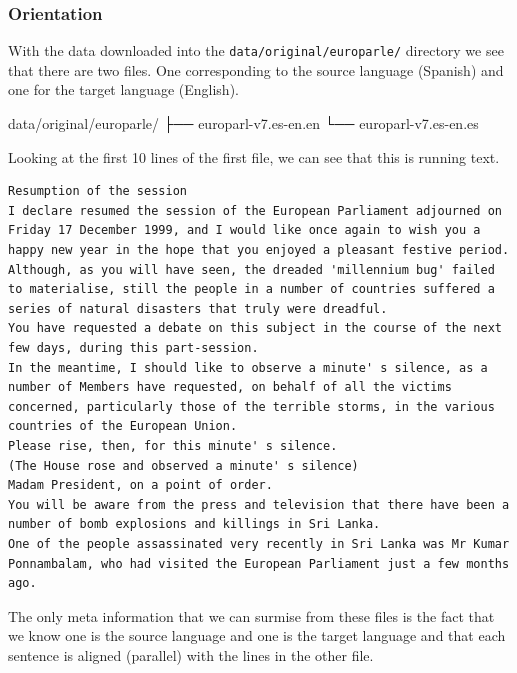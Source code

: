 \documentclass[
]{article}
\newenvironment{Shaded}{\begin{snugshade}}{\end{snugshade}}
\newcommand{\ExtensionTok}[1]{#1}
\newcommand{\NormalTok}[1]{#1}
\begin{document}
\hypertarget{orientation}{%
\subsubsection{Orientation}\label{orientation}}

With the data downloaded into the \texttt{data/original/europarle/} directory we see that there are two files. One corresponding to the source language (Spanish) and one for the target language (English).

\begin{Shaded}
\begin{Highlighting}[]
\ExtensionTok{data/original/europarle/}
\ExtensionTok{├──}\NormalTok{ europarl{-}v7.es{-}en.en}
\ExtensionTok{└──}\NormalTok{ europarl{-}v7.es{-}en.es}
\end{Highlighting}
\end{Shaded}

Looking at the first 10 lines of the first file, we can see that this is running text.

\begin{verbatim}
Resumption of the session
I declare resumed the session of the European Parliament adjourned on Friday 17 December 1999, and I would like once again to wish you a happy new year in the hope that you enjoyed a pleasant festive period.
Although, as you will have seen, the dreaded 'millennium bug' failed to materialise, still the people in a number of countries suffered a series of natural disasters that truly were dreadful.
You have requested a debate on this subject in the course of the next few days, during this part-session.
In the meantime, I should like to observe a minute' s silence, as a number of Members have requested, on behalf of all the victims concerned, particularly those of the terrible storms, in the various countries of the European Union.
Please rise, then, for this minute' s silence.
(The House rose and observed a minute' s silence)
Madam President, on a point of order.
You will be aware from the press and television that there have been a number of bomb explosions and killings in Sri Lanka.
One of the people assassinated very recently in Sri Lanka was Mr Kumar Ponnambalam, who had visited the European Parliament just a few months ago.
\end{verbatim}

The only meta information that we can surmise from these files is the fact that we know one is the source language and one is the target language and that each sentence is aligned (parallel) with the lines in the other file.
\end{document}
